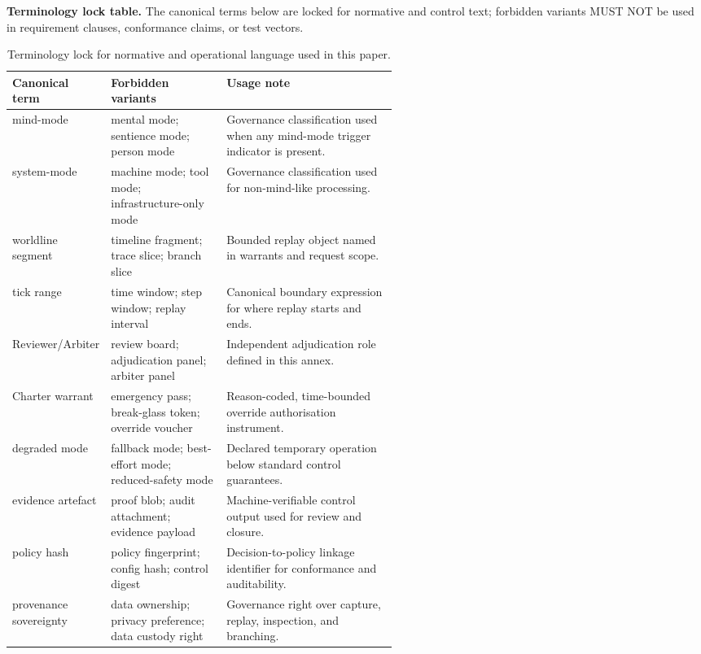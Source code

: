 \documentclass[11pt]{article}
\theoremstyle{definition}
\theoremstyle{plain}
\theoremstyle{remark}
\begin{document}
\textbf{Terminology lock table.}
The canonical terms below are locked for normative and control text; forbidden variants MUST NOT be
used in requirement clauses, conformance claims, or test vectors.

\begin{table}[H]
\centering
\small
\setlength{\tabcolsep}{6pt}
\renewcommand{\arraystretch}{1.22}
\begin{tabularx}{0.98\linewidth}{p{0.25\linewidth} p{0.30\linewidth} Y}
\textbf{Canonical term} & \textbf{Forbidden variants} & \textbf{Usage note} \\ \hline
{}
mind-mode & mental mode; sentience mode; person mode & Governance classification used when any mind-mode trigger indicator is present. \\
system-mode & machine mode; tool mode; infrastructure-only mode & Governance classification used for non-mind-like processing. \\
worldline segment & timeline fragment; trace slice; branch slice & Bounded replay object named in warrants and request scope. \\
tick range & time window; step window; replay interval & Canonical boundary expression for where replay starts and ends. \\
Reviewer/Arbiter & review board; adjudication panel; arbiter panel & Independent adjudication role defined in this annex. \\
Charter warrant & emergency pass; break-glass token; override voucher & Reason-coded, time-bounded override authorisation instrument. \\
degraded mode & fallback mode; best-effort mode; reduced-safety mode & Declared temporary operation below standard control guarantees. \\
evidence artefact & proof blob; audit attachment; evidence payload & Machine-verifiable control output used for review and closure. \\
policy hash & policy fingerprint; config hash; control digest & Decision-to-policy linkage identifier for conformance and auditability. \\
provenance sovereignty & data ownership; privacy preference; data custody right & Governance right over capture, replay, inspection, and branching. \\
\end{tabularx}
\caption{Terminology lock for normative and operational language used in this paper.}
\label{tbl:terminology-lock}
\end{table}
\end{document}

